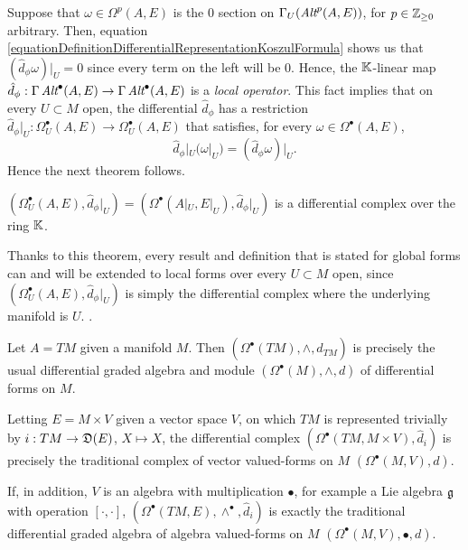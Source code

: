 Suppose that $\omega \in \Omega^p(A, E)$ is the $0$ section on $\Gamma_U(\operatorname{\textit{Alt}}^p(A, E))$, for $p \in \mathbb{Z}_{\geq 0}$ arbitrary. Then, equation \ref{equationDefinitionDifferentialRepresentationKoszulFormula} shows us that $(\hat d_\phi \omega)|_U = 0$ since every term on the left will be $0$. Hence, the $\mathbb{K}$-linear map $\hat d_\phi : \Gamma \Alt^\bullet(A, E) \to \Gamma \Alt^\bullet(A, E)$ is a \emph{local operator}. This fact implies that on every $U \subset M$ open, the differential $\hat d_\phi$ has a restriction $\hat d_\phi|_U: \Omega_U^\bullet(A, E) \to \Omega_U^\bullet(A, E)$ that satisfies, for every $\omega \in \Omega^\bullet(A, E)$, 
    \begin{equation} \label{equationRestrictionOfDifferentialLocalOperatorGoodRestriction}
        \hat d_\phi|_U( \omega|_U) = (\hat d_\phi \omega)|_U.
    \end{equation} 
Hence the next theorem follows.

\begin{theorem}
$(\Omega_U^\bullet(A, E), \hat d_\phi|_U)  = (\Omega^\bullet(A|_U, E|_U), \hat d_\phi|_U)$ is a differential complex over the ring $\mathbb{K}$.
\end{theorem}

\begin{remark}\label{remarkEveryResultAboutDIfferentialComplexExtendedLOcally}
Thanks to this theorem, every result and definition that is stated for global forms can and will be extended to local forms over every $U \subset M$ open, since $(\Omega_U^\bullet(A, E), \hat d_\phi|_U)$ is simply the differential complex where the underlying manifold is $U$. .
\end{remark}

\lin

\begin{example}\label{exampleTraditionalCaseTangentBundleUpToDifferential}
Let $A = TM$ given a manifold $M$. Then $(\Omega^\bullet (TM), \wedge, \hat d_{TM})$ is precisely the usual differential graded algebra and module $(\Omega^\bullet (M), \wedge, d)$ of differential forms on $M$.

\noindent Letting $E = M \times V$ given a vector space $V$, on which $TM$ is represented trivially by $i: TM \to \mathfrak{D}(E)$, $X \mapsto X$, the differential complex $(\Omega^\bullet(TM, M \times V), \hat d_i)$ is precisely the traditional complex of vector valued-forms on $M$ $(\Omega^\bullet(M, V), d)$. 

\noindent If, in addition, $V$ is an algebra with multiplication $\bullet$, for example a Lie algebra $\mathfrak{g}$ with operation $[\cdot, \cdot]$, $(\Omega^\bullet(TM, E), \wedge^\bullet, \hat d_i)$ is exactly the traditional differential graded algebra of algebra valued-forms on $M$ $(\Omega^\bullet(M, V), \bullet, d)$.
\end{example}

